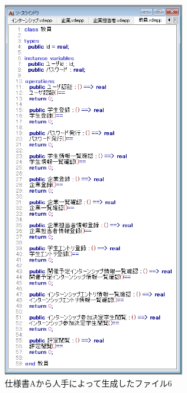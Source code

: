 \begin{figure}[tp]
    \begin{center}
    \includegraphics[width=300]{image/speA_vdm6.PNG}
    \caption{仕様書Aから人手によって生成したファイル6}
    \label{fig:speA_vdm6}
    \end{center}
\end{figure}

